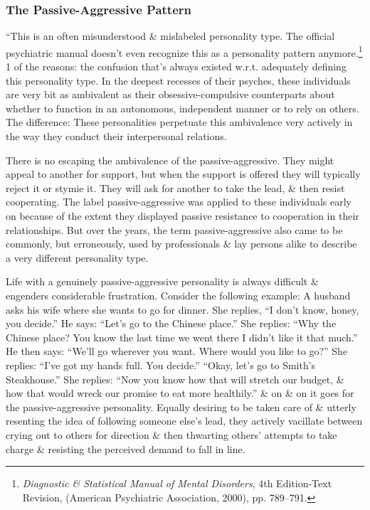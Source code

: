 \documentclass{article}
\numberwithin{equation}{section}
\begin{document}
\subsubsection{The Passive-Aggressive Pattern}
``This is an often misunderstood \& mislabeled personality type. The official psychiatric manual doesn't even recognize this as a personality pattern anymore.\footnote{\textit{Diagnostic \& Statistical Manual of Mental Disorders}, 4th Edition-Text Revision, (American Psychiatric Association, 2000), pp. 789--791.} 1 of the reasons: the confusion that's always existed w.r.t. adequately defining this personality type. In the deepest recesses of their psyches, these individuals are very bit as ambivalent as their obsessive-compulsive counterparts about whether to function in an autonomous, independent manner or to rely on others. The difference: These personalities perpetuate this ambivalence very actively in the way they conduct their interpersonal relations.

There is no escaping the ambivalence of the passive-aggressive. They might appeal to another for support, but when the support is offered they will typically reject it or stymie it. They will ask for another to take the lead, \& then resist cooperating. The label passive-aggressive was applied to these individuals early on because of the extent they displayed passive resistance to cooperation in their relationships. But over the years, the term passive-aggressive also came to be commonly, but erroneously, used by professionals \& lay persons alike to describe a very different personality type.

Life with a genuinely passive-aggressive personality is always difficult \& engenders considerable frustration. Consider the following example: A husband asks his wife where she wants to go for dinner. She replies, ``I don't know, honey, you decide.'' He says: ``Let's go to the Chinese place.'' She replies: ``Why the Chinese place? You know the last time we went there I didn't like it that much.'' He then says: ``We'll go wherever you want. Where would you like to go?'' She replies: ``I've got my hands full. You decide.'' ``Okay, let's go to Smith's Steakhouse.'' She replies: ``Now you know how that will stretch our budget, \& how that would wreck our promise to eat more healthily.'' \& on \& on it goes for the passive-aggressive personality. Equally desiring to be taken care of \& utterly resenting the idea of following someone else's lead, they actively vacillate between crying out to others for direction \& then thwarting others' attempts to take charge \& resisting the perceived demand to fall in line.
\end{document}
